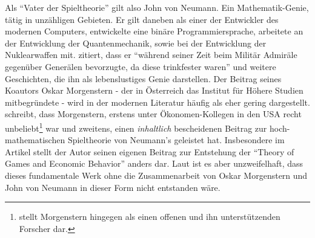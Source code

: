 Als "`Vater der Spieltheorie"' gilt also John von Neumann. Ein Mathematik-Genie, tätig in unzähligen Gebieten. Er gilt daneben als einer der Entwickler des modernen Computers, entwickelte eine binäre Programmiersprache,  arbeitete an der Entwicklung der Quantenmechanik, sowie bei der Entwicklung der Nuklearwaffen mit. \textcite[S. 232]{Bernstein1996} zitiert, dass er "`während seiner Zeit beim Militär Admiräle gegenüber Generälen bevorzugte, da diese trinkfester waren"' und weitere Geschichten, die ihn als lebenslustiges Genie darstellen. Der Beitrag seines Koautors Oskar Morgenstern - der in Österreich das Institut für Höhere Studien mitbegründete - wird in der modernen Literatur häufig als eher gering dargestellt. \textcite[S. 494]{Leonard1994} schreibt, dass Morgenstern, erstens unter Ökonomen-Kollegen in den USA recht unbeliebt\footnote{\textcite[S. 14]{Selten2001} stellt Morgenstern hingegen als einen offenen und ihn unterstützenden Forscher dar.} war und zweitens, einen \textit{inhaltlich} bescheidenen Beitrag zur hoch-mathematischen Spieltheorie von Neumann's geleistet hat. Insbesondere im Artikel \textcite{Morgenstern1976} stellt der Autor seinen eigenen Beitrag zur Entstehung der "`Theory of Games and Economic Behavior"' anders dar. Laut \textcite{Nash1994} ist es aber unzweifelhaft, dass dieses fundamentale Werk ohne die Zusammenarbeit von Oskar Morgenstern und John von Neumann in dieser Form nicht entstanden wäre.

